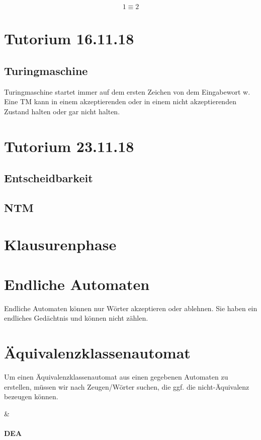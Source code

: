 \documentclass[a4paper]{scrartcl}
\begin{document}
		\[ 1 \equiv 2 \]
		
	\section{Tutorium 16.11.18}
		\subsection{Turingmaschine}
			Turingmaschine startet immer auf dem ersten Zeichen von dem Eingabewort w. \\
			Eine TM kann in einem akzeptierenden oder in einem nicht akzeptierenden Zustand halten oder gar nicht halten.\\
			
	\section{Tutorium 23.11.18}
	
		\subsection{Entscheidbarkeit}
		
		\subsection{NTM}
		
	\section{Klausurenphase}
	\section{Endliche Automaten}
	Endliche Automaten können nur Wörter akzeptieren oder ablehnen. Sie haben ein endliches Gedächtnis und können nicht zählen.
	
	\section{Äquivalenzklassenautomat}
	Um einen Äquivalenzklassenautomat aus einen gegebenen Automaten zu erstellen, müssen wir nach Zeugen/Wörter suchen, die ggf. die nicht-Äquivalenz bezeugen können. 
	\begin{easylist}
		&
	\end{easylist}
	
	\paragraph{DEA}
\end{document}
